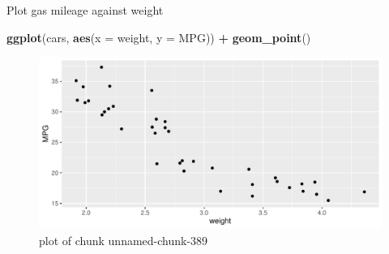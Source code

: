 \documentclass[ignorenonframetext,]{beamer}
\newenvironment{Shaded}{\begin{snugshade}}{\end{snugshade}}
\newcommand{\DataTypeTok}[1]{\textcolor[rgb]{0.13,0.29,0.53}{#1}}
\newcommand{\KeywordTok}[1]{\textcolor[rgb]{0.13,0.29,0.53}{\textbf{#1}}}
\newcommand{\NormalTok}[1]{#1}
\newcommand{\OperatorTok}[1]{\textcolor[rgb]{0.81,0.36,0.00}{\textbf{#1}}}
\newcommand{\StringTok}[1]{\textcolor[rgb]{0.31,0.60,0.02}{#1}}
\begin{document}
\begin{frame}[fragile]{Plot gas mileage against weight}
\protect\hypertarget{plot-gas-mileage-against-weight}{}

\begin{Shaded}
\begin{Highlighting}[]
\KeywordTok{ggplot}\NormalTok{(cars, }\KeywordTok{aes}\NormalTok{(}\DataTypeTok{x =}\NormalTok{ weight, }\DataTypeTok{y =}\NormalTok{ MPG)) }\OperatorTok{+}
\StringTok{  }\KeywordTok{geom_point}\NormalTok{()}
\end{Highlighting}
\end{Shaded}

\begin{figure}
\centering
\includegraphics{figure/unnamed-chunk-389-1.pdf}
\caption{plot of chunk unnamed-chunk-389}
\end{figure}

\end{frame}
\end{document}
